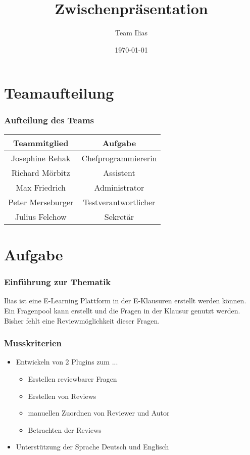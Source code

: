 \documentclass{beamer}
\title{Zwischenpräsentation}
\author{Team Ilias}
\date{\today}
\begin{document}
\maketitle
\frame{\tableofcontents[]}

\section{Teamaufteilung}
\begin{frame}
	\frametitle{Aufteilung des Teams}
	\begin{tabular}{|c|c|}\hline
		Teammitglied & Aufgabe \\\hline
		Josephine Rehak & Chefprogrammiererin\\\hline
		Richard Mörbitz & Assistent\\\hline
		Max Friedrich & Administrator\\\hline
		Peter Merseburger & Testverantwortlicher\\\hline
		Julius Felchow & Sekretär\\\hline
	\end{tabular}
\end{frame} 
 
\section{Aufgabe}
\begin{frame} %
  \frametitle{Einführung zur Thematik} %
  	Ilias ist eine E-Learning Plattform in der E-Klausuren 			erstellt werden können. Ein Fragenpool kann erstellt und die Fragen in der Klausur genutzt werden.\\
    Bisher fehlt eine Reviewmöglichkeit dieser Fragen.
\end{frame}

\begin{frame} %
  \frametitle{Musskriterien} %
    \begin{itemize}
    	\item Entwickeln von 2 Plugins zum ... 
    		\begin{itemize}
    			 \item Erstellen reviewbarer Fragen
    			 \item Erstellen von Reviews
    			 \item manuellen Zuordnen von Reviewer und						Autor
    			 \item Betrachten der Reviews
			\end{itemize}    			
    	\item Unterstützung der Sprache Deutsch und Englisch
    \end{itemize}
\end{frame}
\end{document}
